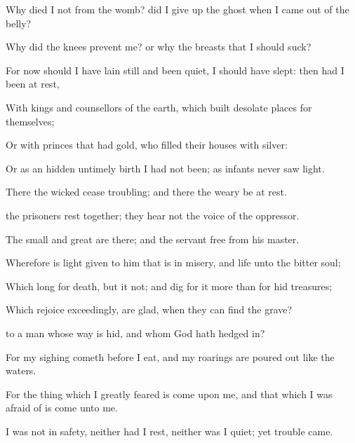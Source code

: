 {\par }{\PP {}Why
died I not from the
womb?
{} did I
{} give up the
ghost when I came
out of the
belly?

Why did the
knees
prevent me? or why the
breasts that I should
suck?

For now should I have lain
still and been
quiet, I should have
slept: then had I been at
rest,

With
kings and
counsellors of the
earth, which
built desolate
places for themselves;

Or with
princes that had
gold, who
filled their
houses with
silver:

Or as an
hidden untimely
birth I had not been; as
infants
{} never
saw
light.

There the
wicked
cease
{}
troubling; and there the
weary be at
rest.

 the
prisoners
rest
together; they
hear not the
voice of the
oppressor.

The
small and
great are there; and the
servant
{}
free from his
master.


\par }{\PP {}Wherefore is
light
given to him that is in
misery, and
life unto the
bitter
{}
soul;

Which
long for
death, but it
{} not; and
dig for it more than for hid
treasures;

Which
rejoice
exceedingly,
{} are
glad, when they can
find the
grave?

 to a
man whose
way is
hid, and whom
God hath hedged
in?

For my
sighing
cometh
before I
eat, and my
roarings are poured
out like the
waters.

For the thing which I
greatly
feared is
come upon me, and that which I was
afraid of is
come unto me.

I was not in
safety, neither had I
rest, neither was I
quiet; yet
trouble
came.




\par }
